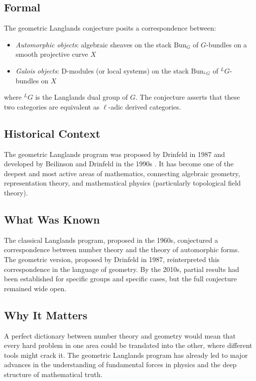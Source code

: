 \subsection{Formal}
The geometric Langlands conjecture posits a correspondence between:
\begin{itemize}
\item \emph{Automorphic objects}: algebraic sheaves on the stack $\mathrm{Bun}_G$ of $G$-bundles on a smooth projective curve $X$
\item \emph{Galois objects}: D-modules (or local systems) on the stack $\mathrm{Bun}_{^L G}$ of $^L G$-bundles on $X$
\end{itemize}
where $^L G$ is the Langlands dual group of $G$. The conjecture asserts that these two categories are equivalent as $\ell$-adic derived categories.

\subsection{Historical Context}
The geometric Langlands program was proposed by Drinfeld in 1987 and developed by Beilinson and Drinfeld in the 1990s \cite{drinfeld1987, beilinson2004}. It has become one of the deepest and most active areas of mathematics, connecting algebraic geometry, representation theory, and mathematical physics (particularly topological field theory).

\subsection{What Was Known}
The classical Langlands program, proposed in the 1960s, conjectured a correspondence between number theory and the theory of automorphic forms. The geometric version, proposed by Drinfeld in 1987, reinterpreted this correspondence in the language of geometry. By the 2010s, partial results had been established for specific groups and specific cases, but the full conjecture remained wide open.

\subsection{Why It Matters}
A perfect dictionary between number theory and geometry would mean that every hard problem in one area could be translated into the other, where different tools might crack it. The geometric Langlands program has already led to major advances in the understanding of fundamental forces in physics and the deep structure of mathematical truth.

